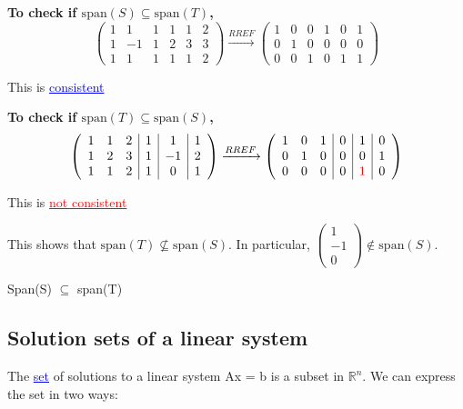 \documentclass{article}
\newcommand{\bul}[1]{\textcolor{blue}{\underline{#1}}}
\newcommand{\rul}[1]{\textcolor{red}{\underline{#1}}}
\newcommand{\sbreak}{\vspace{10pt}}
\begin{document}
\sbreak

\textbf{To check if \( \text{span}(S) \subseteq \text{span}(T) \),} 
\[
\left(
\begin{array}{ccc|c|c|c}
1 & 1 & 1 & 1 & 1 & 2 \\
1 & -1 & 1 & 2 & 3 & 3 \\
1 & 1 & 1 & 1 & 1 & 2
\end{array}
\right)
\xrightarrow{RREF}
\left(
\begin{array}{ccc|c|c|c}
1 & 0 & 0 & 1 & 0 & 1 \\
0 & 1 & 0 & 0 & 0 & 0 \\
0 & 0 & 1 & 0 & 1 & 1
\end{array}
\right)
\]
\begin{center}
    This is \bul{consistent}
\end{center}

\sbreak

\textbf{To check if \( \text{span}(T) \subseteq \text{span}(S) \),}
\[
\left(
\begin{array}{ccc|c|c|c}
1 & 1 & 2 & 1 & 1 & 1 \\
1 & 2 & 3 & 1 & -1 & 2 \\
1 & 1 & 2 & 1 & 0 & 1
\end{array}
\right)
\xrightarrow{RREF}
\left(
\begin{array}{ccc|c|c|c}
1 & 0 & 1 & 0 & 1 & 0 \\
0 & 1 & 0 & 0 & 0 & 1 \\
0 & 0 & 0 & 0 & \textcolor{red}{1} & 0
\end{array}
\right)
\]
\begin{center}
    This is \rul{not consistent}
\end{center}

\sbreak


This shows that \( \text{span}(T) \not\subseteq \text{span}(S) \). In particular, 
$
\begin{pmatrix} 
1 \\ -1 \\ 0 
\end{pmatrix}
\notin \text{span}(S).
$

Span(S) $\subseteq$ span(T)


\subsection{Solution sets of a linear system}
The \bul{set} of solutions to a linear system Ax = b is a subset in $\mathbb{R}^n$. We can express the set in two ways:
\end{document}
